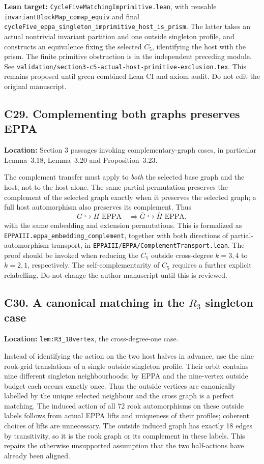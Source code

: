 \documentclass[11pt,a4paper]{article}
\begin{document}
\textbf{Lean target:}
\texttt{CycleFiveMatchingImprimitive.lean}, with reusable
\texttt{invariantBlockMap\_comap\_equiv} and final
\texttt{cycleFive\_eppa\_singleton\_imprimitive\_host\_is\_prism}.
The latter takes an actual nontrivial invariant partition
and one outside singleton profile, and constructs an
equivalence fixing the selected \(C_5\), identifying the
host with the prism. The finite primitive obstruction is
in the independent preceding module.
See \texttt{validation/section3-c5-actual-host-primitive-exclusion.tex}.
This remains proposed until green combined Lean CI and
axiom audit. Do not edit the original manuscript.

\subsection*{C29. Complementing both graphs preserves EPPA}
\textbf{Location:} Section 3 passages invoking
complementary-graph cases, in particular Lemma~3.18,
Lemma~3.20 and Proposition~3.23.

The complement transfer must apply to \emph{both}
the selected base graph and the host, not to the host
alone. The same partial permutation preserves the
complement of the selected graph exactly when it preserves
the selected graph; a full host automorphism also preserves
its complement. Thus
\[
        G\hookrightarrow H\text{ EPPA}\quad\Longrightarrow
        \overline G\hookrightarrow\overline H\text{ EPPA},
\]
with the same embedding and extension permutations.
This is formalized as
\texttt{EPPAIII.eppa\_embedding\_complement},
together with both directions of partial-automorphism
transport, in \texttt{EPPAIII/EPPA/ComplementTransport.lean}.
The proof should be invoked when reducing the
\(C_5\) outside cross-degree \(k=3,4\) to
\(k=2,1\), respectively. The self-complementarity
of \(C_5\) requires a further explicit relabelling.
Do not change the author manuscript until this
is reviewed.


\subsection*{C30. A canonical matching in the \(R_3\) singleton case}
\textbf{Location:} \texttt{lem:R3\_18vertex}, the
cross-degree-one case.

Instead of identifying the action on the two host halves
in advance, use the nine rook-grid translations of a
single outside singleton profile. Their orbit contains
nine different singleton neighbourhoods; by EPPA and
the nine-vertex outside budget each occurs exactly once.
Thus the outside vertices are canonically labelled
by the unique selected neighbour and the cross graph
is a perfect matching. The induced action of all
72 rook automorphisms on these outside labels follows
from actual EPPA lifts and uniqueness of their profiles;
coherent choices of lifts are unnecessary.
The outside induced graph has exactly 18 edges
by transitivity, so it is the rook graph or
its complement in these labels.
This repairs the otherwise unsupported assumption
that the two half-actions have already been aligned.
\end{document}
